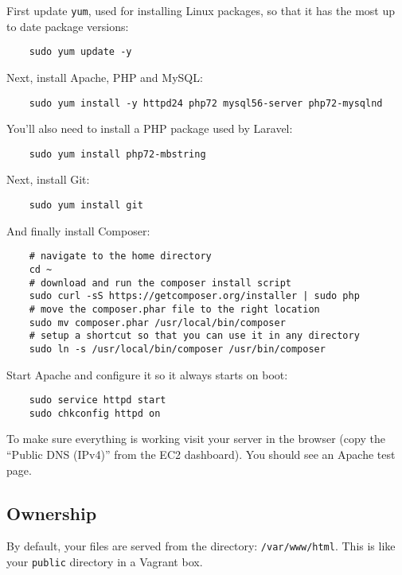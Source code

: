 First update \texttt{yum}, used for installing Linux packages, so that it has the most up to date package versions:

\begin{verbatim}
    sudo yum update -y
\end{verbatim}

Next, install Apache, PHP and MySQL:

\begin{verbatim}
    sudo yum install -y httpd24 php72 mysql56-server php72-mysqlnd
\end{verbatim}

You'll also need to install a PHP package used by Laravel:

\begin{verbatim}
    sudo yum install php72-mbstring
\end{verbatim}

Next, install Git:

\begin{verbatim}
    sudo yum install git
\end{verbatim}

And finally install Composer:

\begin{verbatim}
    # navigate to the home directory
    cd ~
    # download and run the composer install script
    sudo curl -sS https://getcomposer.org/installer | sudo php
    # move the composer.phar file to the right location
    sudo mv composer.phar /usr/local/bin/composer
    # setup a shortcut so that you can use it in any directory
    sudo ln -s /usr/local/bin/composer /usr/bin/composer
\end{verbatim}

Start Apache and configure it so it always starts on boot:

\begin{verbatim}
    sudo service httpd start
    sudo chkconfig httpd on
\end{verbatim}

To make sure everything is working visit your server in the browser (copy the ``Public DNS (IPv4)'' from the EC2 dashboard). You should see an Apache test page.

\subsection{Ownership}

By default, your files are served from the directory: \texttt{/var/www/html}. This is like your \texttt{public} directory in a Vagrant box.
\\

